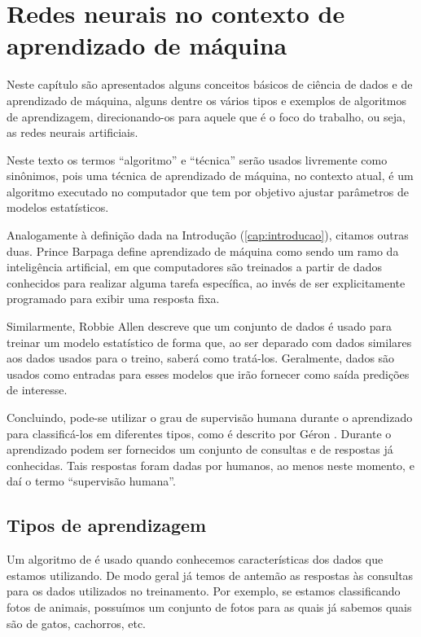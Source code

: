 
\chapter{Redes neurais no contexto de aprendizado de máquina}
\label{cap:redes}

Neste capítulo são apresentados alguns conceitos básicos de ciência de dados e de aprendizado de máquina, alguns dentre os vários tipos e exemplos de algoritmos de aprendizagem, direcionando-os para aquele que é o foco do trabalho, ou seja, as redes neurais artificiais.

Neste texto os termos ``algoritmo'' e ``técnica'' serão usados livremente como sinônimos, pois uma técnica de aprendizado de máquina, no contexto atual, é um algoritmo executado no computador que tem por objetivo ajustar parâmetros de modelos estatísticos.

Analogamente à definição dada na Introdução (\ref{cap:introducao}), citamos outras duas. Prince Barpaga \citep{prince} define aprendizado de máquina como sendo um ramo da inteligência artificial, em que computadores são treinados a partir de dados conhecidos para realizar alguma tarefa específica, ao invés de ser explicitamente programado para exibir uma resposta fixa.

Similarmente, Robbie Allen \citep{allen} descreve que um conjunto de dados é usado para treinar um modelo estatístico de forma que, ao ser deparado com dados similares aos dados usados para o treino, saberá como tratá-los. Geralmente, dados são usados como entradas para esses modelos que irão fornecer como saída predições de interesse.

Concluindo, pode-se utilizar o grau de supervisão humana durante o aprendizado para classificá-los em diferentes tipos, como é descrito por Géron \citep{hands}. Durante o aprendizado podem ser fornecidos um conjunto de consultas e de respostas já conhecidas. Tais respostas foram dadas por humanos, ao menos neste momento, e daí o termo ``supervisão humana''.

\section{Tipos de aprendizagem}

Um algoritmo de  é usado quando conhecemos características dos dados que estamos utilizando. De modo geral já temos de antemão as respostas às consultas para os dados utilizados no treinamento. Por exemplo, se estamos classificando fotos de animais, possuímos um conjunto de fotos para as quais já sabemos quais são de gatos, cachorros, etc.

